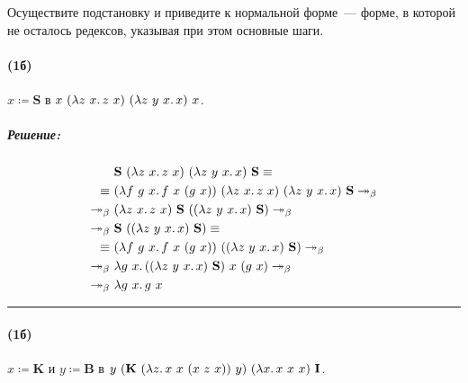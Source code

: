 \documentclass{article}
\newenvironment{proof}{\subparagraph{\hspace{-1em}Решение:\newline}\-}{\par\noindent\rule{\textwidth}{0.4pt}}
\newcommand{\comb}[1]{\mathbf{#1}}
\newcommand{\termdef}{\coloneqq}
\newcommand{\betasteps}{\twoheadrightarrow_\beta}
\begin{document}
    \subsubsection{}

    Осуществите подстановку и приведите к нормальной форме~--- форме, в которой не осталось редексов, указывая при этом основные шаги.

    \paragraph{(1б)}

    $x \termdef \comb{S}$ в $x~(\lambda z~x\ldotp z~x)~(\lambda z~y~x\ldotp x)~x$.

    \begin{proof}
        \begin{align}
            & \comb{S}~(\lambda z~x\ldotp z~x)~(\lambda z~y~x\ldotp x)~\comb{S} \equiv \\
            \equiv~ & (\lambda f~g~x\ldotp f~x~(g~x))~(\lambda z~x\ldotp z~x)~(\lambda z~y~x\ldotp x)~\comb{S} \betasteps \\
            \betasteps~ & (\lambda z~x\ldotp z~x)~\comb{S}~((\lambda z~y~x\ldotp x)~\comb{S}) \betasteps \\
            \betasteps~ & \comb{S}~((\lambda z~y~x\ldotp x)~\comb{S}) \equiv \\
            \equiv~ & (\lambda f~g~x\ldotp f~x~(g~x))~((\lambda z~y~x\ldotp x)~\comb{S}) \betasteps \\
            \betasteps~ & \lambda g~x\ldotp ((\lambda z~y~x\ldotp x)~\comb{S})~x~(g~x) \betasteps \\
            \betasteps~ & \lambda g~x\ldotp g~x
        \end{align} 
    \end{proof}

    \paragraph{(1б)}

    $x \termdef \comb{K}$ и $y \termdef \comb{B}$ в $y~(\comb{K}~(\lambda z\ldotp x~x~(x~z~x))~y)~(\lambda x\ldotp x~x~x)~\comb{I}$.
\end{document}
